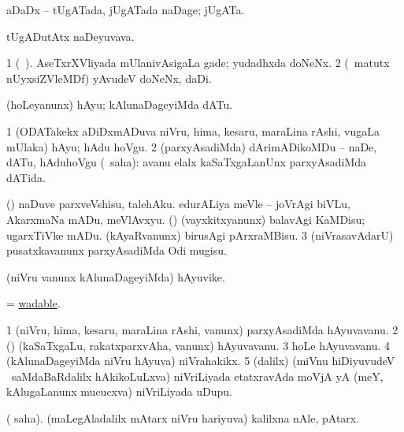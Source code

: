 \bentry
{} 
\gl{\nA}
\expl{}
\bmng
aDaDx -- tUgATada, jUgATada naDage; jUgATa. 
\emng
\eentry

\bentry
{} 
\gl{\nA}
\bmng
tUgADutAtx naDeyuvava. 
\emng
\eentry

\bentry
{} 
\gl{\nA}
\bmng
\bnum
\num{1} (\bava\ ). AseTxrXVliyada mUlanivAsigaLa gade; yudadhxda doNeNx. 
\num{2} (\AseTxrXV\ matutx nUyxsiZVleMDf) yAvudeV doNeNx, daDi. 
\enum
\emng
\eentry

\bentry
{} 
\gl{\sakirx}
\expl{}
\bmng
(hoLeyanunx) hAyu; kAlunaDageyiMda dATu. 
\emng

\noindent 
\gl{\akirx}
\expl{}
\bmng
\bnum
\num{1} (ODATakekx aDiDxmADuva niVru, hima, kesaru, maraLina rAshi, \mo vugaLa mUlaka) hAyu; hAdu hoVgu. 
\num{2} (parxyAsadiMda) dArimADikoMDu -- naDe, dATu, hAduhoVgu (\rUpa\ saha):  avanu elalx kaSaTxgaLanUnx parxyAsadiMda dATida. 
\enum
\emng

\noindent
\gl{\pagu}
\expl{}
\bmng
\bnum
{}  (\AmA) 
\banum
{} naDuve parxveVshisu, talehAku. 
 edurALiya meVle -- joVrAgi biVLu, AkarxmaNa mADu, meVlAvxyu. 
\eanum
\numie
{}  (\AmA) 
\banum
{} (vayxkitxyanunx) balavAgi KaMDisu; ugarxTiVke mADu. 
 (kAyaRvanunx) birusAgi pArxraMBisu. 
\eanum
\numie
\num{3}  (niVrasavAdarU) pusatxkavanunx parxyAsadiMda Odi mugisu. 
\enum
\emng
\eentry

\bentry
{} 
\gl{\nA}
\expl{}
\bmng
(niVru \mo vanunx kAlunaDageyiMda) hAyuvike. 
\emng
\eentry

\bentry
{} 
\gl{\gu}
\expl{}
\bmng
= \hyperlink{wadable}{wadable}. 
\emng
\eentry

\bentry
{} 
\gl{\nA}
\bmng
\bnum
\num{1} (niVru, hima, kesaru, maraLina rAshi, \mo vanunx) parxyAsadiMda hAyuvavanu. 
\num{2} (\rUpa) (kaSaTxgaLu, rakatxparxvAha, \mo vanunx) hAyuvavanu. 
\num{3} hoLe hAyuvavanu. 
\num{4} (kAlunaDageyiMda niVru hAyuva) niVrahakikx. 
\num{5} (\bava dalilx) (miVnu hiDiyuvudeV \mo\ saMdaBaRdalilx hAkikoLuLxva) niVriLiyada etatxravAda moVjA yA (meY, kAlugaLanunx mucucxva) niVriLiyada uDupu. 
\enum
\emng
\eentry

\bentry
{} 
\gl{\nA}
\bmng
( saha). (maLegAladalilx mAtarx niVru hariyuva) kalilxna nAle, pAtarx. 
\emng
\eentry

